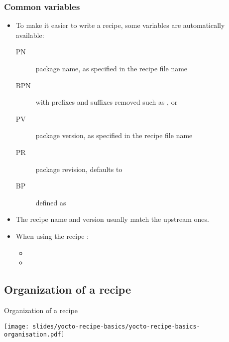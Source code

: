 \begin{frame}
  \frametitle{Common variables}
  \begin{itemize}
    \item To make it easier to write a recipe, some variables are
      automatically available:
      \begin{description}
        \item[PN] package name, as specified in the recipe file name
        \item[BPN]  with prefixes and suffixes removed such
          as , or 
        \item[PV] package version, as specified in the recipe file
          name
        \item[PR] package revision, defaults to 
        \item[BP] defined as 
      \end{description}
    \item The recipe name and version usually match the upstream ones.
    \item When using the recipe :
      \begin{itemize}
        \item {}
        \item {}
      \end{itemize}
  \end{itemize}
\end{frame}

\subsection{Organization of a recipe}

\begin{frame}{Organization of a recipe}
  \begin{center}
    \texttt{[image: slides/yocto-recipe-basics/yocto-recipe-basics-organisation.pdf]}
  \end{center}
\end{frame}

